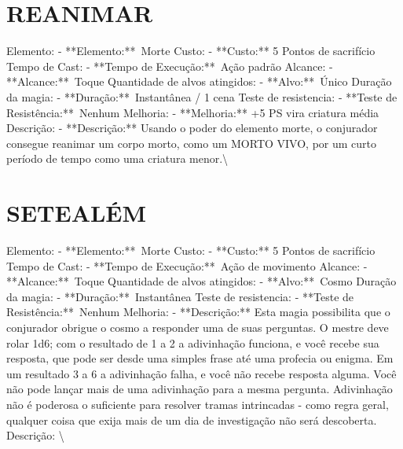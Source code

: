 \documentclass{article}%
\begin{document}
\section{REANIMAR}%
\label{sec:REANIMAR}%
Elemento: {-} **Elemento:**~Morte\newline%
Custo: {-} **Custo:** 5 Pontos de sacrifício\newline%
Tempo de Cast: {-} **Tempo de Execução:**~Ação padrão\newline%
Alcance: {-} **Alcance:**~Toque\newline%
Quantidade de alvos atingidos: {-} **Alvo:**~Único\newline%
Duração da magia: {-} **Duração:**~Instantânea / 1 cena\newline%
Teste de resistencia: {-} **Teste de Resistência:**~Nenhum\newline%
Melhoria: {-} **Melhoria:** +5 PS vira criatura média\newline%
Descrição: {-} **Descrição:** Usando o poder do elemento morte, o conjurador consegue reanimar um corpo morto, como um MORTO VIVO, por um curto período de tempo como uma criatura menor.\textbackslash{}

%
\section{SETEALÉM}%
\label{sec:SETEALM}%
Elemento: {-} **Elemento:**~Morte\newline%
Custo: {-} **Custo:** 5 Pontos de sacrifício\newline%
Tempo de Cast: {-} **Tempo de Execução:**~Ação de movimento\newline%
Alcance: {-} **Alcance:**~Toque\newline%
Quantidade de alvos atingidos: {-} **Alvo:**~Cosmo\newline%
Duração da magia: {-} **Duração:**~Instantânea\newline%
Teste de resistencia: {-} **Teste de Resistência:**~Nenhum\newline%
Melhoria: {-} **Descrição:** Esta magia possibilita que o conjurador obrigue o cosmo a responder uma de suas perguntas. O mestre deve rolar 1d6; com o resultado de 1 a 2 a adivinhação funciona, e você recebe sua resposta, que pode ser desde uma simples frase até uma profecia ou enigma. Em um resultado 3 a 6 a adivinhação falha, e você não recebe resposta alguma. Você não pode lançar mais de uma adivinhação para a mesma pergunta. Adivinhação não é poderosa o suficiente para resolver tramas intrincadas {-} como regra geral, qualquer coisa que exija mais de um dia de investigação não será descoberta.\newline%
Descrição: \textbackslash{}
\end{document}
